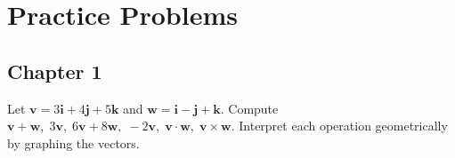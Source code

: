 \documentclass[openany]{book}
\begin{document}
\chapter{Practice Problems}




\section{Chapter 1}



\begin{prob}[1]
    Let \( \mathbf{v} = 3\mathbf{i} + 4\mathbf{j} + 5\mathbf{k} \) and \( \mathbf{w} = \mathbf{i} - \mathbf{j} + \mathbf{k} \). Compute  
    \( \mathbf{v} + \mathbf{w},\; 3\mathbf{v},\; 6\mathbf{v} + 8\mathbf{w},\; -2\mathbf{v},\; \mathbf{v} \cdot \mathbf{w},\; \mathbf{v} \times \mathbf{w} \).  
    Interpret each operation geometrically by graphing the vectors.
\end{prob}
\end{document}
